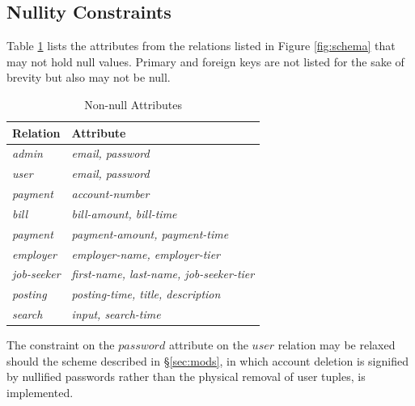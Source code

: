 \documentclass{article}
\begin{document}
        \subsection{Nullity Constraints}
            Table \ref{tab:non_null} lists the attributes from the relations listed in Figure \ref{fig:schema} that may
            not hold null values. Primary and foreign keys are not listed for the sake of brevity but also may not be
            null. \par
            \begin{table}[h]
                \centering
                \begin{tabular}{|l|l|}
                    \hline
                    \textbf{Relation}   & \textbf{Attribute}                              \\ \hline
                    \textit{admin}      & \textit{email, password}                        \\ \hline
                    \textit{user}       & \textit{email, password}                        \\ \hline
                    \textit{payment}    & \textit{account-number}                         \\ \hline
                    \textit{bill}       & \textit{bill-amount, bill-time}                 \\ \hline
                    \textit{payment}    & \textit{payment-amount, payment-time}           \\ \hline
                    \textit{employer}   & \textit{employer-name, employer-tier}           \\ \hline
                    \textit{job-seeker} & \textit{first-name, last-name, job-seeker-tier} \\ \hline
                    \textit{posting}    & \textit{posting-time, title, description}       \\ \hline
                    \textit{search}     & \textit{input, search-time}                     \\ \hline
                \end{tabular}
                \caption{Non-null Attributes}
                \label{tab:non_null}
            \end{table}
            The constraint on the $password$ attribute on the $user$ relation may be relaxed should the scheme 
            described in \S \ref{sec:mods}, in which account deletion is signified by nullified passwords rather than
            the physical removal of user tuples, is implemented.
\end{document}

